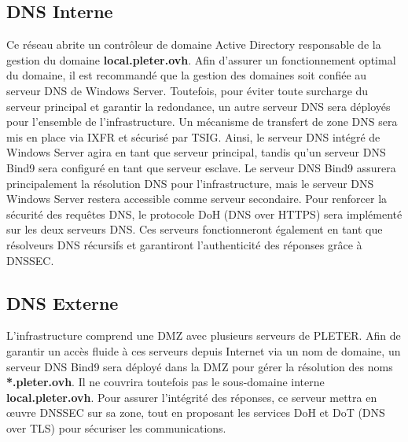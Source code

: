 \documentclass[../Livrable1.tex]{subfiles}
\begin{document}
	
	
	\subsection{DNS Interne}
	
	Ce réseau abrite un contrôleur de domaine Active Directory responsable de la gestion du domaine \textbf{local.pleter.ovh}. Afin d'assurer un fonctionnement optimal du domaine, il est recommandé que la gestion des domaines soit confiée au serveur DNS de Windows Server. Toutefois, pour éviter toute surcharge du serveur principal et garantir la redondance, un autre serveur DNS sera déployés pour l'ensemble de l'infrastructure. Un mécanisme de transfert de zone DNS sera mis en place via IXFR et sécurisé par TSIG. Ainsi, le serveur DNS intégré de Windows Server agira en tant que serveur principal, tandis qu'un serveur DNS Bind9 sera configuré en tant que serveur esclave. Le serveur DNS Bind9 assurera principalement la résolution DNS pour l'infrastructure, mais le serveur DNS Windows Server restera accessible comme serveur secondaire. Pour renforcer la sécurité des requêtes DNS, le protocole DoH (DNS over HTTPS) sera implémenté sur les deux serveurs DNS. Ces serveurs fonctionneront également en tant que résolveurs DNS récursifs et garantiront l'authenticité des réponses grâce à DNSSEC.
	
	
	
	\subsection{DNS Externe}
	
	L'infrastructure comprend une DMZ avec plusieurs serveurs de PLETER. Afin de garantir un accès fluide à ces serveurs depuis Internet via un nom de domaine, un serveur DNS Bind9 sera déployé dans la DMZ pour gérer la résolution des noms \textbf{*.pleter.ovh}. Il ne couvrira toutefois pas le sous-domaine interne \textbf{local.pleter.ovh}. Pour assurer l'intégrité des réponses, ce serveur mettra en œuvre DNSSEC sur sa zone, tout en proposant les services DoH et DoT (DNS over TLS) pour sécuriser les communications.




	
\end{document}
